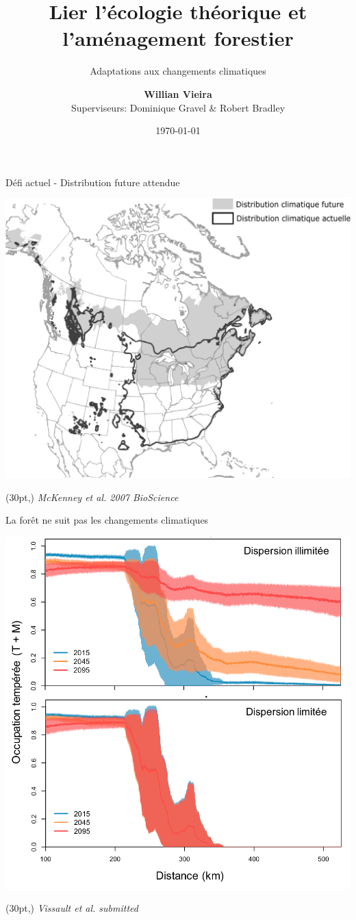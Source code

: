 \documentclass[11pt, compress, aspectratio=1610]{beamer}
\title{Lier l'écologie théorique et \newline l'aménagement forestier}
\subtitle{Adaptations aux changements climatiques}
\date{\today}
\author{\textbf{Willian Vieira}\\
Superviseurs: Dominique Gravel \& Robert Bradley \newline}
\institute{}
\newcommand\smallcitation[1]{%
\begin{textblock*}{\textwidth}(30pt,\textheight)
	\raggedleft \footnotesize\textit{#1}
\end{textblock*}}
\begin{document}
\maketitle

\begin{frame}{Défi actuel - Distribution future attendue}

\centering
 \includegraphics[scale=0.4]{figures/mckenney.pdf}\par

\smallcitation{McKenney et al. 2007 BioScience}

\end{frame}

\begin{frame}{La forêt ne suit pas les changements climatiques}

\centering
 \includegraphics[scale=0.45]{figures/Vissault.pdf}\par

\smallcitation{Vissault et al. submitted}

\end{frame}
\end{document}
